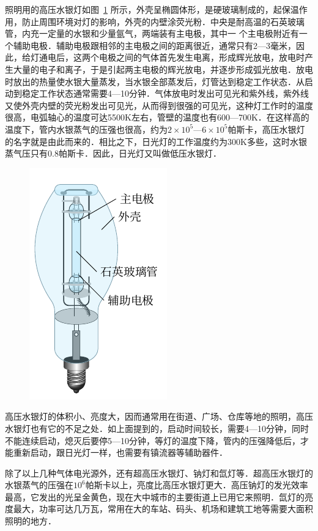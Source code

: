 照明用的高压水银灯如图~\ref{fig_B_8-13} 所示，外壳呈椭圆体形，是硬玻璃制成的，起保温作用，防止周围环境对灯的影响，外壳的内壁涂荧光粉．中央是耐高温的石英玻璃管，内充一定量的水银和少量氩气，两端装有主电极，其中一
个主电极附近有一个辅助电极．辅助电极跟相邻的主电极之间的距离很近，通常只有2—3毫米，因此，给灯通电后，这两个电极之间的气体首先发生电离，形成辉光放电，放电时产生大量的电子和离子，于是引起两主电极的辉光放电，并逐步形成弧光放电．放电时放出的热量使水银大量蒸发，当水银全部蒸发后，灯管达到稳定工作状态．从启动到稳定工作状态通常需要4—10分钟．气体放电时发出可见光和紫外线，紫外线又使外壳内壁的荧光粉发出可见光，从而得到很强的可见光，这种灯工作时的温度很高，电弧轴心的温度可达5500K左右，管壁的温度也有600—700K．在这样高的温度下，管内水银蒸气的压强也很高，约为$2\times10^5$—$6\times10^5$帕斯卡，高压水银灯的名字就是由此而来的．相比之下，日光灯的工作温度约为300K多些，这时水银蒸气压只有0.8帕斯卡．因此，日光灯又叫做低压水银灯．
\begin{figure}[htbp]
    \centering
    \includegraphics{fig/B/8-13.pdf}
    \caption{}\label{fig_B_8-13}
\end{figure}

高压水银灯的体积小、亮度大，因而通常用在街道、广场、仓库等地的照明，高压水银灯也有它的不足之处．如上面提到的，启动时间较长，需要4—10分钟，同时不能连续启动，熄灭后要停5—10分钟，等灯的温度下降，管内的压强降低后，才能重新启动，跟日光灯一样，也需要有镇流器等辅助器件．

除了以上几种气体电光源外，还有超高压水银灯、钠灯和氙灯等．超高压水银灯的水银蒸气的压强在$10^6$帕斯卡以上，亮度比高压水银灯更大．高压钠灯的发光效率最高，它发出的光呈金黄色，现在大中城市的主要街道上已用它来照明．氙灯的亮度最大，功率可达几万瓦，常用在大的车站、码头、机场和建筑工地等需要大面积照明的地方．

